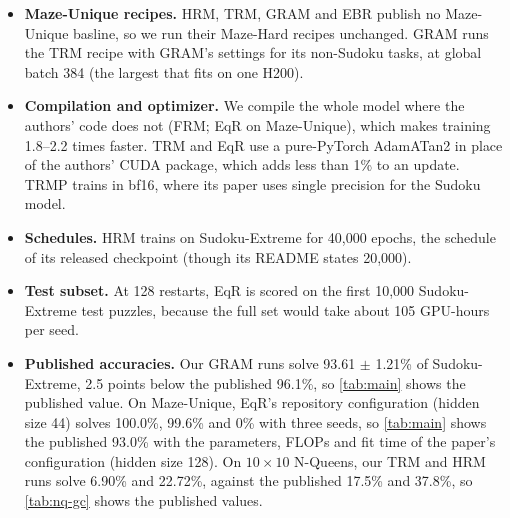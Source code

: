 \documentclass{article}
\begin{document}
\begin{itemize}
\item \textbf{Maze-Unique recipes.} HRM, TRM, GRAM and EBR publish no Maze-Unique basline, so we run their Maze-Hard recipes unchanged. GRAM runs the TRM recipe with GRAM's settings for its non-Sudoku tasks, at global batch 384 (the largest that fits on one H200).
\item \textbf{Compilation and optimizer.} We compile the whole model where the authors' code does not (FRM; EqR on Maze-Unique), which makes training 1.8--2.2 times faster. TRM and EqR use a pure-PyTorch AdamATan2 in place of the authors' CUDA package, which adds less than 1\% to an update. TRMP trains in bf16, where its paper uses single precision for the Sudoku model.
\item \textbf{Schedules.} HRM trains on Sudoku-Extreme for 40,000 epochs, the schedule of its released checkpoint (though its README states 20,000).
\item \textbf{Test subset.} At 128 restarts, EqR is scored on the first 10,000 Sudoku-Extreme test puzzles, because the full set would take about 105 GPU-hours per seed.
\item \textbf{Published accuracies.} Our GRAM runs solve 93.61 $\pm$ 1.21\% of Sudoku-Extreme, 2.5 points below the published 96.1\%, so \cref{tab:main} shows the published value. On Maze-Unique, EqR's repository configuration (hidden size 44) solves 100.0\%, 99.6\% and 0\% with three seeds, so \cref{tab:main} shows the published 93.0\% with the parameters, FLOPs and fit time of the paper's configuration (hidden size 128). On $10\times10$ N-Queens, our TRM and HRM runs solve 6.90\% and 22.72\%, against the published 17.5\% and 37.8\%, so \cref{tab:nq-gc} shows the published values.
\end{itemize}
\end{document}
